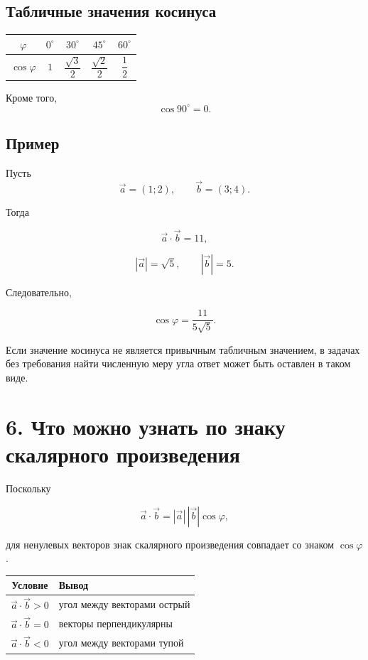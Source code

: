 \documentclass[a4paper,12pt]{article}
\newcommand{\dotprod}{\mathbin{\cdot}}
\begin{document}
\subsection*{Табличные значения косинуса}

\begin{center}
\renewcommand{\arraystretch}{1.3}
\begin{tabular}{ccccc}
\toprule
\(\varphi\) &
\(0^\circ\) &
\(30^\circ\) &
\(45^\circ\) &
\(60^\circ\) \\
\midrule
\(\cos\varphi\) &
\(1\) &
\(\dfrac{\sqrt3}{2}\) &
\(\dfrac{\sqrt2}{2}\) &
\(\dfrac12\) \\
\bottomrule
\end{tabular}
\end{center}

Кроме того,
\[
\cos90^\circ=0.
\]

\subsection*{Пример}

Пусть
\[
\vec a=(1;2),
\qquad
\vec b=(3;4).
\]

Тогда

\[
\vec a\dotprod\vec b=11,
\]

\[
|\vec a|=\sqrt5,
\qquad
|\vec b|=5.
\]

Следовательно,

\[
\cos\varphi
=
\frac{11}{5\sqrt5}.
\]

Если значение косинуса не является привычным табличным значением, в задачах без требования найти численную меру угла ответ может быть оставлен в таком виде.


\section*{\color{darkaccent}6. Что можно узнать по знаку скалярного произведения}

Поскольку

\[
\vec a\dotprod\vec b
=
|\vec a|\,|\vec b|\cos\varphi,
\]

для ненулевых векторов знак скалярного произведения совпадает со знаком \(\cos\varphi\).

\begin{center}
\renewcommand{\arraystretch}{1.35}
\begin{tabularx}{\linewidth}{cX}
\toprule
Условие & Вывод \\
\midrule
\(\vec a\dotprod\vec b>0\)
&
угол между векторами острый
\\

\(\vec a\dotprod\vec b=0\)
&
векторы перпендикулярны
\\

\(\vec a\dotprod\vec b<0\)
&
угол между векторами тупой
\\
\bottomrule
\end{tabularx}
\end{center}
\end{document}

